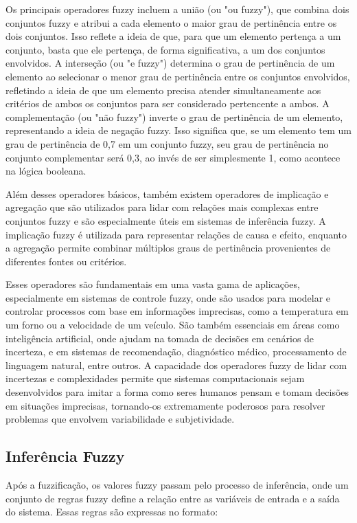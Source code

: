 \documentclass[12pt]{article}
\begin{document}
Os principais operadores fuzzy incluem a união (ou "ou fuzzy"), que combina dois conjuntos fuzzy e atribui a cada elemento o maior grau de pertinência entre os dois conjuntos. Isso reflete a ideia de que, para que um elemento pertença a um conjunto, basta que ele pertença, de forma significativa, a um dos conjuntos envolvidos. A interseção (ou "e fuzzy") determina o grau de pertinência de um elemento ao selecionar o menor grau de pertinência entre os conjuntos envolvidos, refletindo a ideia de que um elemento precisa atender simultaneamente aos critérios de ambos os conjuntos para ser considerado pertencente a ambos. A complementação (ou "não fuzzy") inverte o grau de pertinência de um elemento, representando a ideia de negação fuzzy. Isso significa que, se um elemento tem um grau de pertinência de 0,7 em um conjunto fuzzy, seu grau de pertinência no conjunto complementar será 0,3, ao invés de ser simplesmente 1, como acontece na lógica booleana.

Além desses operadores básicos, também existem operadores de implicação e agregação que são utilizados para lidar com relações mais complexas entre conjuntos fuzzy e são especialmente úteis em sistemas de inferência fuzzy. A implicação fuzzy é utilizada para representar relações de causa e efeito, enquanto a agregação permite combinar múltiplos graus de pertinência provenientes de diferentes fontes ou critérios.

Esses operadores são fundamentais em uma vasta gama de aplicações, especialmente em sistemas de controle fuzzy, onde são usados para modelar e controlar processos com base em informações imprecisas, como a temperatura em um forno ou a velocidade de um veículo. São também essenciais em áreas como inteligência artificial, onde ajudam na tomada de decisões em cenários de incerteza, e em sistemas de recomendação, diagnóstico médico, processamento de linguagem natural, entre outros. A capacidade dos operadores fuzzy de lidar com incertezas e complexidades permite que sistemas computacionais sejam desenvolvidos para imitar a forma como seres humanos pensam e tomam decisões em situações imprecisas, tornando-os extremamente poderosos para resolver problemas que envolvem variabilidade e subjetividade.

\subsection{Inferência Fuzzy}

Após a fuzzificação, os valores fuzzy passam pelo processo de inferência, onde um conjunto de regras fuzzy define a relação entre as variáveis de entrada e a saída do sistema. Essas regras são expressas no formato:
\end{document}
